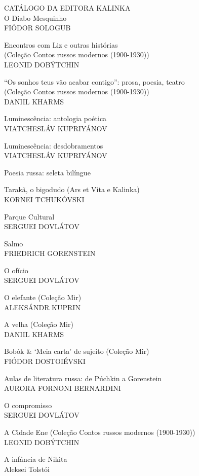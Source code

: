 \afterpage{\blankpage}

\newpage
\pagestyle{empty}

\tiny{
\noindent{}CATÁLOGO DA EDITORA KALINKA\\[5pt]

\noindent{}O Diabo Mesquinho\\
FIÓDOR SOLOGUB
\medskip

\noindent{}Encontros com Liz e outras histórias\\(Coleção Contos russos modernos (1900-1930))\\
LEONID DOBÝTCHIN
\medskip

\noindent{}“Os sonhos teus vão acabar contigo”: prosa, poesia, teatro\\(Coleção Contos russos modernos (1900-1930))\\
DANIIL KHARMS
\medskip

\noindent{}Luminescência: antologia poética\\
VIATCHESLÁV KUPRIYÁNOV
\medskip

\noindent{}Luminescência: desdobramentos\\
VIATCHESLÁV KUPRIYÁNOV
\medskip

\noindent{}Poesia russa: seleta bilíngue
\medskip

\noindent{}Tarakã, o bigodudo (Ars et Vita e Kalinka)\\
KORNEI TCHUKÓVSKI
\medskip

\noindent{}Parque Cultural\\
SERGUEI DOVLÁTOV
\medskip

\noindent{}Salmo\\
FRIEDRICH GORENSTEIN
\medskip

\noindent{}O ofício\\
SERGUEI DOVLÁTOV
\medskip

\noindent{}O elefante (Coleção Mir)\\
ALEKSÁNDR KUPRIN
\medskip

\noindent{}A velha (Coleção Mir)\\
DANIIL KHARMS 
\medskip

\noindent{}Bobók \& ‘Meia carta’ de sujeito (Coleção Mir)\\
FIÓDOR DOSTOIÉVSKI
\medskip

\noindent{}Aulas de literatura russa: de Púchkin a Gorenstein \\
AURORA FORNONI BERNARDINI
\medskip

\noindent{}O compromisso\\
SERGUEI DOVLÁTOV
\medskip

\noindent{}A Cidade Ene (Coleção Contos russos modernos (1900-1930))\\
LEONID DOBÝTCHIN
\medskip

\noindent{}A infância de Nikita\\
Aleksei Tolstói
}

